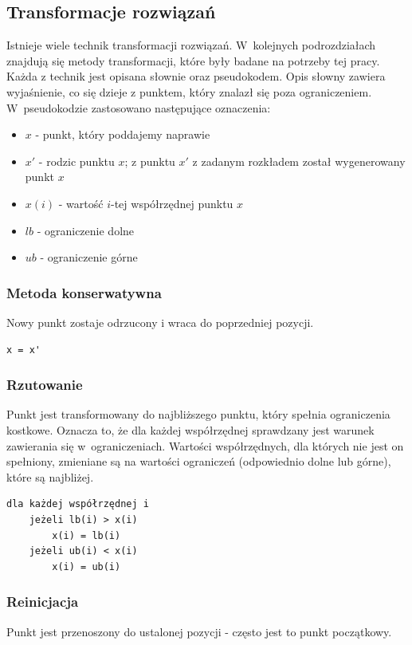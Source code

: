 \documentclass{mini}
\begin{document}
\subsection{Transformacje rozwiązań} \label{transformacje}
Istnieje wiele technik transformacji rozwiązań. W~kolejnych podrozdziałach znajdują się metody transformacji, które były badane na potrzeby tej pracy. Każda z technik jest opisana słownie oraz pseudokodem. Opis słowny zawiera wyjaśnienie, co się dzieje z punktem, który znalazł się poza ograniczeniem. W~pseudokodzie zastosowano następujące oznaczenia:
\begin{itemize}[noitemsep]
\item $x$ - punkt, który poddajemy naprawie
\item $x'$ - rodzic punktu $x$; z punktu $x'$ z zadanym rozkładem został wygenerowany punkt $x$
\item $x(i)$ - wartość $i$-tej współrzędnej punktu $x$
\item $lb$ - ograniczenie dolne
\item $ub$ - ograniczenie górne
\end{itemize}

\subsubsection{Metoda konserwatywna}
Nowy punkt zostaje odrzucony i wraca do poprzedniej pozycji.

\begin{Verbatim}[baselinestretch=1.1]
x = x'
\end{Verbatim}


\subsubsection{Rzutowanie}
\label{secrzut}
Punkt jest transformowany do najbliższego punktu, który spełnia ograniczenia kostkowe. Oznacza to, że dla każdej współrzędnej sprawdzany jest warunek zawierania się w~ograniczeniach. Wartości współrzędnych, dla których nie jest on spełniony, zmieniane są na wartości ograniczeń (odpowiednio dolne lub górne), które są najbliżej.

\begin{Verbatim}[baselinestretch=1.1]
dla każdej współrzędnej i
	jeżeli lb(i) > x(i)
		x(i) = lb(i)
	jeżeli ub(i) < x(i)
		x(i) = ub(i)
\end{Verbatim}

\subsubsection{Reinicjacja} \label{reinicjacja}
Punkt jest przenoszony do ustalonej pozycji - często jest to punkt początkowy.
\end{document}
